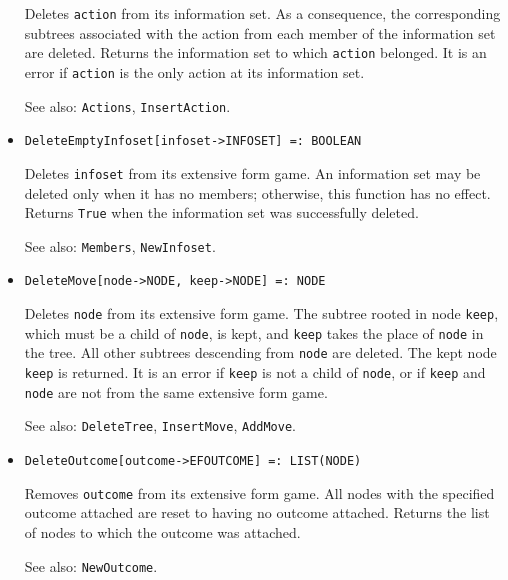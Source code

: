 \begin{itemize}
\bd
Deletes \verb+action+ from its information set. 
As a consequence, the corresponding subtrees associated
with the action from each member of the information set are deleted.
Returns the information set to which \verb+action+ belonged.  It is an
error if \verb+action+ is the only action at its information set.
\item [See also:] \verb+Actions+, \verb+InsertAction+.
\ed

\item{}
\protect \large \begin{verbatim}
DeleteEmptyInfoset[infoset->INFOSET] =: BOOLEAN 
\end{verbatim}\normalsize

\bd
Deletes \verb+infoset+ from its extensive form game.  An information set
may be deleted only when it has no members; otherwise, this function has
no effect.  Returns \verb+True+ when the information set was successfully
deleted.
\item [See also:] \verb+Members+, \verb+NewInfoset+.
\ed

\item{}
\protect \large \begin{verbatim}
DeleteMove[node->NODE, keep->NODE] =: NODE 
\end{verbatim}\normalsize

\bd
Deletes \verb+node+ from its extensive form game.  The
subtree rooted in node \verb+keep+, which must be a child of
\verb+node+, is kept, and \verb+keep+ takes the place of \verb+node+ in
the tree.  All other subtrees descending from \verb+node+ are deleted.
The kept node \verb+keep+ is returned.  It is an error if \verb+keep+
is not a child of \verb+node+, or if \verb+keep+ and \verb+node+ are not
from the same extensive form game.
\item [See also:] \verb+DeleteTree+, \verb+InsertMove+, \verb+AddMove+.
\ed

\item{}
\protect \large \begin{verbatim}
DeleteOutcome[outcome->EFOUTCOME] =: LIST(NODE) 
\end{verbatim}\normalsize

\bd
Removes \verb+outcome+ from its extensive
form game.  All nodes with the specified outcome attached are reset to
having no outcome attached.  Returns the list of nodes to which
the outcome was attached.
\item [See also:] \verb+NewOutcome+.
\ed


\end{itemize}
